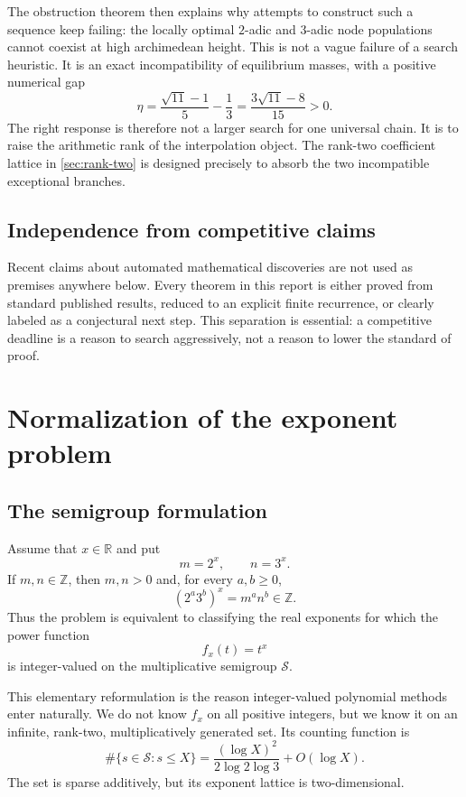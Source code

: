 \documentclass[11pt]{article}
\theoremstyle{definition}
\theoremstyle{remark}
\newcommand{\Z}{\mathbb Z}
\newcommand{\R}{\mathbb R}
\newcommand{\calS}{\mathcal S}
\begin{document}
The obstruction theorem then explains why attempts to construct such a sequence keep failing: the locally optimal $2$-adic and $3$-adic node populations cannot coexist at high archimedean height.  This is not a vague failure of a search heuristic.  It is an exact incompatibility of equilibrium masses, with a positive numerical gap
\[
   \eta=\frac{\sqrt{11}-1}{5}-\frac13
       =\frac{3\sqrt{11}-8}{15}>0.
\]
The right response is therefore not a larger search for one universal chain.  It is to raise the arithmetic rank of the interpolation object.  The rank-two coefficient lattice in \cref{sec:rank-two} is designed precisely to absorb the two incompatible exceptional branches.

\subsection{Independence from competitive claims}
Recent claims about automated mathematical discoveries are not used as premises anywhere below.  Every theorem in this report is either proved from standard published results, reduced to an explicit finite recurrence, or clearly labeled as a conjectural next step.  This separation is essential: a competitive deadline is a reason to search aggressively, not a reason to lower the standard of proof.

\section{Normalization of the exponent problem}

\subsection{The semigroup formulation}
Assume that $x\in\R$ and put
\[
       m=2^x,\qquad n=3^x.
\]
If $m,n\in\Z$, then $m,n>0$ and, for every $a,b\ge0$,
\begin{equation}\label{eq:all-smooth-values}
       (2^a3^b)^x=m^a n^b\in\Z.
\end{equation}
Thus the problem is equivalent to classifying the real exponents for which the power function
\[
       f_x(t)=t^x
\]
is integer-valued on the multiplicative semigroup $\calS$.

This elementary reformulation is the reason integer-valued polynomial methods enter naturally.  We do not know $f_x$ on all positive integers, but we know it on an infinite, rank-two, multiplicatively generated set.  Its counting function is
\[
  \#\{s\in\calS:s\le X\}
   =\frac{(\log X)^2}{2\log2\log3}+O(\log X).
\]
The set is sparse additively, but its exponent lattice is two-dimensional.
\end{document}
